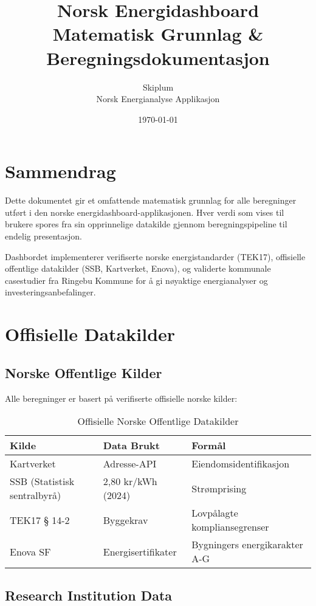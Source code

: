 \documentclass[12pt,a4paper]{article}
\title{Norsk Energidashboard\\Matematisk Grunnlag \& Beregningsdokumentasjon}
\author{Skiplum\\Norsk Energianalyse Applikasjon}
\date{\today}
\begin{document}
\maketitle

\tableofcontents
\newpage

\section{Sammendrag}

Dette dokumentet gir et omfattende matematisk grunnlag for alle beregninger utført i den norske energidashboard-applikasjonen. Hver verdi som vises til brukere spores fra sin opprinnelige datakilde gjennom beregningspipeline til endelig presentasjon.

Dashbordet implementerer verifiserte norske energistandarder (TEK17), offisielle offentlige datakilder (SSB, Kartverket, Enova), og validerte kommunale casestudier fra Ringebu Kommune for å gi nøyaktige energianalyser og investeringsanbefalinger.

\section{Offisielle Datakilder}

\subsection{Norske Offentlige Kilder}

Alle beregninger er basert på verifiserte offisielle norske kilder:

\begin{table}[H]
\centering
\begin{tabular}{|l|l|l|}
\hline
\textbf{Kilde} & \textbf{Data Brukt} & \textbf{Formål} \\
\hline
Kartverket & Adresse-API & Eiendomsidentifikasjon \\
SSB (Statistisk sentralbyrå) & 2,80 kr/kWh (2024) & Strømprising \\
TEK17 § 14-2 & Byggekrav & Lovpålagte kompliansegrenser \\
Enova SF & Energisertifikater & Bygningers energikarakter A-G \\
\hline
\end{tabular}
\caption{Offisielle Norske Offentlige Datakilder}
\end{table}

\subsection{Research Institution Data}
\end{document}
